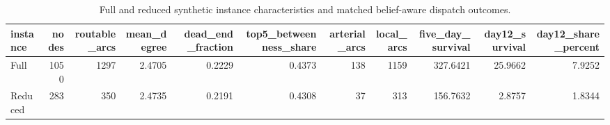 \begin{table}
\caption{Full and reduced synthetic instance characteristics and matched belief-aware dispatch outcomes.}
\label{tab:instance-characteristics}
\begin{tabular}{lrrrrrrrrrr}
\toprule
instance & nodes & routable_arcs & mean_degree & dead_end_fraction & top5_betweenness_share & arterial_arcs & local_arcs & five_day_survival & day12_survival & day12_share_percent \\
\midrule
Full & 1050 & 1297 & 2.4705 & 0.2229 & 0.4373 & 138 & 1159 & 327.6421 & 25.9662 & 7.9252 \\
Reduced & 283 & 350 & 2.4735 & 0.2191 & 0.4308 & 37 & 313 & 156.7632 & 2.8757 & 1.8344 \\
\bottomrule
\end{tabular}
\end{table}
